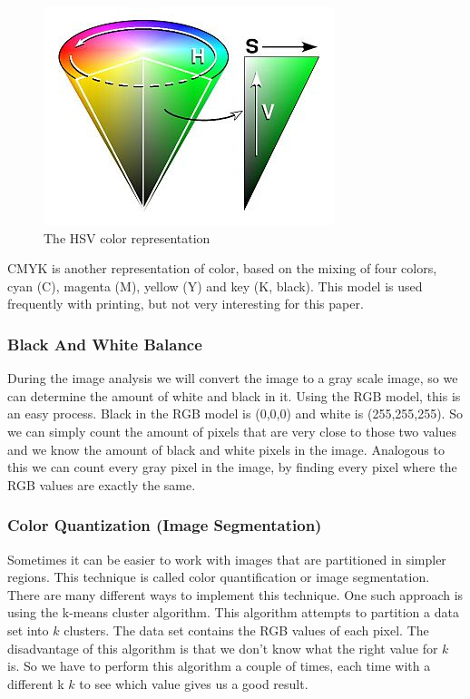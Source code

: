\documentclass[12pt]{article}
\begin{document}
\begin{figure}[h]
\centering
\includegraphics[scale = 0.45]{img/hsv}
\caption{The HSV color representation}
\end{figure}

CMYK is another representation of color, based on the mixing of four colors, cyan (C), magenta (M), yellow (Y) and key (K, black). This model is used frequently with printing, but not very interesting for this paper.

\subsubsection{Black And White Balance}
During the image analysis we will convert the image to a gray scale image, so we can determine the amount of white and black in it. Using the RGB model, this is an easy process. Black in the RGB model is (0,0,0) and white is (255,255,255). So we can simply count the amount of pixels that are very close to those two values and we know the amount of black and white pixels in the image.
Analogous to this we can count every gray pixel in the image, by finding every pixel where the RGB values are exactly the same.

\subsubsection{Color Quantization (Image Segmentation)}

Sometimes it can be easier to work with images that are partitioned in simpler regions. This technique is called color quantification or image segmentation. There are many different ways to implement this technique. One such approach is using the k-means cluster algorithm. This algorithm attempts to partition a data set into $k$ clusters. The data set contains the RGB values of each pixel.
The disadvantage of this algorithm is that we don't know what the right value for $k$ is. So we have to perform this algorithm a couple of times, each time with a different k $k$ to see which value gives us a good result.
\newline
\end{document}
